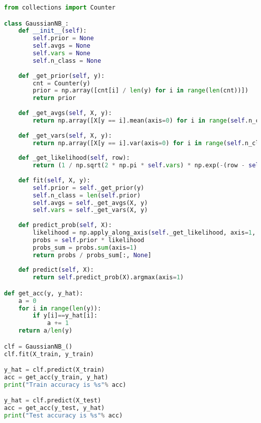 \begin{lstlisting}[language=Python]
from collections import Counter

class GaussianNB_:
    def __init__(self):
        self.prior = None
        self.avgs = None
        self.vars = None
        self.n_class = None
        
    def _get_prior(self, y):
        cnt = Counter(y)
        prior = np.array([cnt[i] / len(y) for i in range(len(cnt))])
        return prior
    
    def _get_avgs(self, X, y):
        return np.array([X[y == i].mean(axis=0) for i in range(self.n_class)])
    
    def _get_vars(self, X, y):
        return np.array([X[y == i].var(axis=0) for i in range(self.n_class)])
    
    def _get_likelihood(self, row):
        return (1 / np.sqrt(2 * np.pi * self.vars) * np.exp(-(row - self.avgs)**2 / (2 * self.vars))).prod(axis=1)
    
    def fit(self, X, y):
        self.prior = self._get_prior(y)
        self.n_class = len(self.prior)
        self.avgs = self._get_avgs(X, y)
        self.vars = self._get_vars(X, y)
        
    def predict_prob(self, X):
        likelihood = np.apply_along_axis(self._get_likelihood, axis=1, arr=X)
        probs = self.prior * likelihood
        probs_sum = probs.sum(axis=1)
        return probs / probs_sum[:, None]
    
    def predict(self, X):
        return self.predict_prob(X).argmax(axis=1)

def get_acc(y, y_hat):
    a = 0
    for i in range(len(y)):
        if y[i]==y_hat[i]:
            a += 1
    return a/len(y)

clf = GaussianNB_()
clf.fit(X_train, y_train)

y_hat = clf.predict(X_train)
acc = get_acc(y_train, y_hat)
print("Train accuracy is %s"% acc)

y_hat = clf.predict(X_test)
acc = get_acc(y_test, y_hat)
print("Test accuracy is %s"% acc)
\end{lstlisting}

